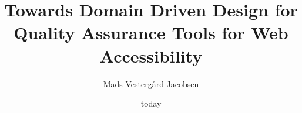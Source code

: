 

\title{
	Towards Domain Driven Design for Quality Assurance Tools for Web Accessibility
}
\author{Mads Vesterg\aa rd Jacobsen}

\date{today}



\frontmatter
	
	
\mainmatter
	\maketitle

	\pagestyle{headings}
	\setcounter{page}{1}
	

	
	
	
	
	
	
	
	

	
	

	

